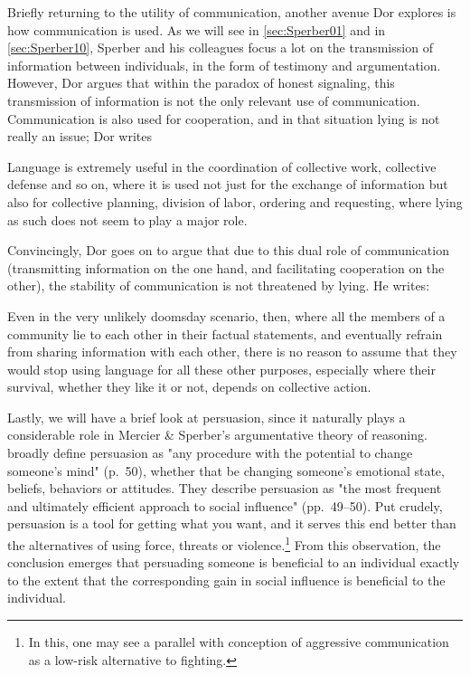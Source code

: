 Briefly returning to the utility of communication, another avenue Dor explores is how communication is used. As we will see in \cref{sec:Sperber01} and in \cref{sec:Sperber10}, Sperber and his colleagues focus a lot on the transmission of information between individuals, in the form of testimony and argumentation. However, Dor argues that within the paradox of honest signaling, this transmission of information is not the only relevant use of communication. Communication is also used for cooperation, and in that situation lying is not really an issue; Dor writes
\begin{quoting}
    Language is extremely useful in the coordination of collective work, collective defense and so on, where it is used not just for the exchange of information but also for collective planning, division of labor, ordering and requesting, where lying as such does not seem to play a major role.
    \hfill \citep[p.~51]{Dor17}
\end{quoting}
Convincingly, Dor goes on to argue that due to this dual role of communication (transmitting information on the one hand, and facilitating cooperation on the other), the stability of communication is not threatened by lying. He writes:
\begin{quoting}
    Even in the very unlikely doomsday scenario, then, where all the members of a community lie to each other in their factual statements, and eventually refrain from sharing information with each other, there is no reason to assume that they would stop using language for all these other purposes, especially where their survival, whether they like it or not, depends on collective action.
    \hfill \citep[p.~52]{Dor17}
\end{quoting}

Lastly, we will have a brief look at persuasion, since it naturally plays a considerable role in Mercier \& Sperber's argumentative theory of reasoning.
\citet{Brinol09} broadly define persuasion as "any procedure with the potential to change someone's mind" (p.~50),
whether that be changing someone's emotional state, beliefs, behaviors or attitudes.
They describe persuasion as "the most frequent and ultimately efficient approach to social influence" (pp.~49--50). Put crudely, persuasion is a tool for getting what you want, and it serves this end better than the alternatives of using force, threats or violence.\footnote{In this, one may see a parallel with  conception of aggressive communication as a low-risk alternative to fighting.}
From this observation, the conclusion emerges that persuading someone is beneficial to an individual exactly to the extent that the corresponding gain in social influence is beneficial to the individual.
